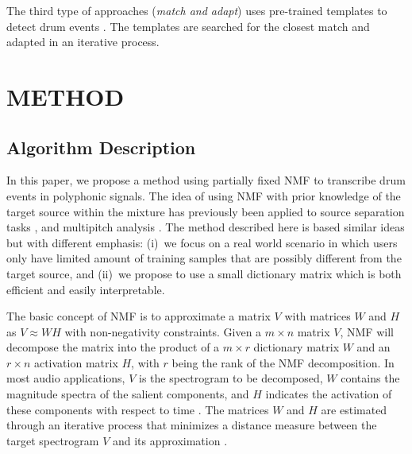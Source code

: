 \documentclass{article}
\begin{document}
The third type of approaches (\textit{match and adapt}) uses pre-trained templates to detect drum events \cite{yoshii_drum_2007}. The templates are searched for the closest match and adapted in an iterative process. %
 

\vspace{-2mm}
\section{METHOD}\label{sec:method}
\subsection{Algorithm Description}\label{subsec:algorithm description}
In this paper, we propose a method using partially fixed NMF to transcribe drum events in polyphonic signals. The idea of using NMF with prior knowledge of the target source within the mixture has previously been applied to source separation tasks \cite{smaragdis_ssnmf_2007}, and multipitch analysis \cite{raczynski_hnmf_2007}. The method described here is based similar ideas but with different emphasis: 
(i)~we focus on a real world scenario in which users only have limited amount of training samples that are possibly different from the target source, and
(ii)~we propose to use a small dictionary matrix which is both efficient and easily interpretable.   

The basic concept of NMF is to approximate a matrix $V$ with matrices $W$ and $H$ as $V \approx WH$ with non-negativity constraints. Given a $m \times n$ matrix $V$, NMF will decompose the matrix into the product of a $m \times r$ dictionary matrix $W$ and an $r \times n$ activation matrix $H$, with $r$ being the rank of the NMF decomposition. In most audio applications, $V$ is the spectrogram to be decomposed, $W$ contains the magnitude spectra of the salient components, and $H$ indicates the activation of these components with respect to time \cite{smaragdis_non-negative_2003}. The matrices $W$ and $H$ are estimated through an iterative process that minimizes a distance measure between the target spectrogram $V$ and its approximation \cite{lee_algorithms_2000}. 
\end{document}
